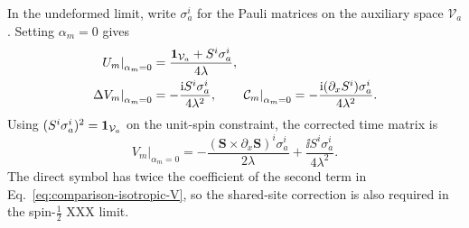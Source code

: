 In the undeformed limit, write $\sigma_a^i$ for the Pauli matrices on the
auxiliary space $\mathcal V_a$.  Setting $\alpha_m=0$ gives
\begin{align}
\left.U_m\right|_{\alpha_m=0}
&=\frac{\mathbf{1}_{\mathcal V_a}+S^i\sigma_a^i}{4\lambda},
\label{eq:comparison-isotropic-U}\\
\left.\Delta V_m\right|_{\alpha_m=0}
&=-\frac{\mathrm{i} S^i\sigma_a^i}{4\lambda^2},
\qquad
\left.\mathcal C_m\right|_{\alpha_m=0}
=-\frac{\mathrm{i}(\partial_x S^i)\sigma_a^i}{4\lambda^2}.
\label{eq:comparison-isotropic-correction}
\end{align}
Using $(S^i\sigma_a^i)^2=\mathbf{1}_{\mathcal V_a}$ on the unit-spin constraint,
the corrected time matrix is
\begin{equation}
\left.V_m\right|_{\alpha_m=0}
=-\frac{(\boldsymbol S\times\partial_x\boldsymbol S)^i\sigma_a^i}
{2\lambda}
+\frac{\ii S^i\sigma_a^i}{4\lambda^2}.
\label{eq:comparison-isotropic-V}
\end{equation}
The direct symbol has twice the coefficient of the second term in
Eq.~\eqref{eq:comparison-isotropic-V}, so the shared-site correction is also
required in the spin-$\tfrac12$ XXX limit.

